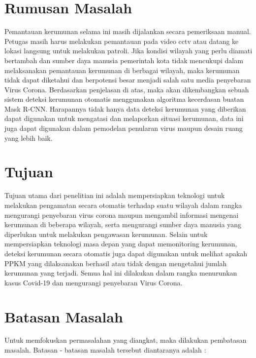 \section{Rumusan Masalah}
Pemantauan kerumunan selama ini masih dijalankan secara pemeriksaan manual. Petugas masih harus melakukan
pemantauan pada video cctv atau datang ke lokasi langsung untuk melakukan patroli. Jika kondisi wilayah yang
perlu diamati bertambah dan sumber daya manusia pemerintah kota tidak mencukupi dalam melaksanakan pemantauan kerumunan di
berbagai wilayah, maka kerumunan tidak dapat diketahui dan berpotensi besar menjadi salah satu media penyebaran
Virus Corona. Berdasarkan penjelasan di atas, maka akan dikembangkan sebuah sistem deteksi kerumunan otomatis
menggunakan algoritma kecerdasan buatan Mask R-CNN. Harapannya tidak hanya data deteksi kerumunan yang diberikan
dapat digunakan untuk mengatasi dan melaporkan situasi kerumunan,
data ini juga dapat digunakan dalam pemodelan penularan virus maupun desain ruang yang lebih baik.

\section{Tujuan}
Tujuan utama dari penelitian ini adalah mempersiapkan teknologi untuk melakukan
pengamatan secara otomatis terhadap suatu wilayah dalam rangka mengurangi penyebaran virus
corona maupun mengambil informasi mengenai kerumunan di beberapa wilayah,
serta mengurangi sumber daya manusia yang diperlukan untuk melakukan pengawasan kerumunan.
Selain untuk mempersiapkan teknologi masa depan yang dapat memonitoring kerumunan, 
deteksi kerumunan secara otomatis juga dapat digunakan untuk melihat apakah PPKM yang 
dilaksanakan berhasil atau tidak dengan mengetahui jumlah kerumunan yang terjadi. 
Semua hal ini dilakukan dalam rangka menurunkan kasus Covid-19 dan mengurangi penyebaran Virus Corona.

\section{Batasan Masalah}

Untuk memfokuskan permasalahan yang diangkat, maka dilakukan pembatasan masalah.
Batasan - batasan masalah tersebut diantaranya adalah :

